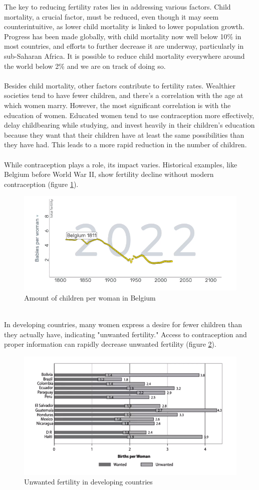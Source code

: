 \documentclass[../summary.tex]{subfiles}
\begin{document}
The key to reducing fertility rates lies in addressing various factors. Child mortality, a crucial factor, must be reduced, even though it may seem counterintuitive, as lower child mortality is linked to lower population growth. Progress has been made globally, with child mortality now well below 10\% in most countries, and efforts to further decrease it are underway, particularly in sub-Saharan Africa. It is possible to reduce child mortality everywhere around the world below 2\% and we are on track of doing so.\\
\\
Besides child mortality, other factors contribute to fertility rates. Wealthier societies tend to have fewer children, and there's a correlation with the age at which women marry. However, the most significant correlation is with the education of women. Educated women tend to use contraception more effectively, delay childbearing while studying, and invest heavily in their children's education because they want that  their children have at least the same possibilities than they have had. This leads to a more rapid reduction in the number of children.\\
\\
While contraception plays a role, its impact varies. Historical examples, like Belgium before World War II, show fertility decline without modern contraception (figure \ref{fig:childrenperwoman}). 

\begin{figure}[H]
	\centering
	\includegraphics[width=0.7\linewidth]{../images/children_per_woman}
	\caption{Amount of children per woman in Belgium}
	\label{fig:childrenperwoman}
\end{figure}
\ \\
In developing countries, many women express a desire for fewer children than they actually have, indicating "unwanted fertility." Access to contraception and proper information can rapidly decrease unwanted fertility (figure \ref{fig:unwantedfertility}).

\begin{figure}[H]
	\centering
	\includegraphics[width=0.7\linewidth]{../images/unwanted_fertility}
	\caption{Unwanted fertility in developing countries}
	\label{fig:unwantedfertility}
\end{figure}
\end{document}
